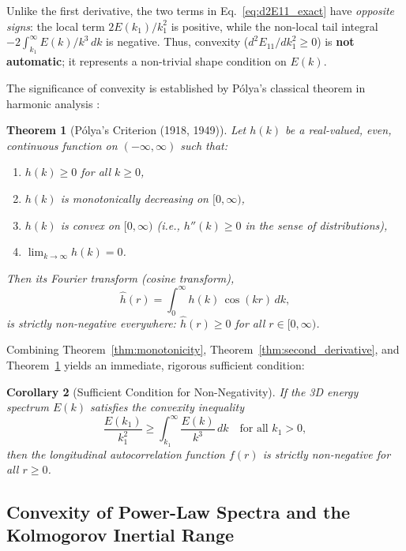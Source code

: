 \documentclass[lineno]{jfm}
\newtheorem{theorem}{Theorem}
\newtheorem{corollary}[theorem]{Corollary}
\begin{document}
Unlike the first derivative, the two terms in Eq.~\eqref{eq:d2E11_exact} have \emph{opposite signs}: the local term $2E(k_1)/k_1^2$ is positive, while the non-local tail integral $-2\int_{k_1}^\infty E(k)/k^3\,dk$ is negative. Thus, convexity ($d^2 E_{11}/dk_1^2 \ge 0$) is \textbf{not automatic}; it represents a non-trivial shape condition on $E(k)$.

The significance of convexity is established by P\'olya's classical theorem in harmonic analysis \citep{Polya1949}:

\begin{theorem}[P\'olya's Criterion (1918, 1949)]
\label{thm:polya}
Let $h(k)$ be a real-valued, even, continuous function on $(-\infty, \infty)$ such that:
\begin{enumerate}
\item $h(k) \ge 0$ for all $k \ge 0$,
\item $h(k)$ is monotonically decreasing on $[0, \infty)$,
\item $h(k)$ is convex on $[0, \infty)$ (i.e., $h''(k) \ge 0$ in the sense of distributions),
\item $\lim_{k \to \infty} h(k) = 0$.
\end{enumerate}
Then its Fourier transform (cosine transform),
\begin{equation}
\hat{h}(r) = \int_0^\infty h(k)\,\cos(kr)\,dk,
\end{equation}
is strictly non-negative everywhere: $\hat{h}(r) \ge 0$ for all $r \in [0, \infty)$.
\end{theorem}

Combining Theorem~\ref{thm:monotonicity}, Theorem~\ref{thm:second_derivative}, and Theorem~\ref{thm:polya} yields an immediate, rigorous sufficient condition:

\begin{corollary}[Sufficient Condition for Non-Negativity]
\label{cor:sufficient}
If the 3D energy spectrum $E(k)$ satisfies the convexity inequality
\begin{equation}
\frac{E(k_1)}{k_1^2} \ge \int_{k_1}^\infty \frac{E(k)}{k^3}\,dk \quad \text{for all } k_1 > 0,
\label{eq:convexity_condition}
\end{equation}
then the longitudinal autocorrelation function $f(r)$ is strictly non-negative for all $r \ge 0$.
\end{corollary}

\subsection{Convexity of Power-Law Spectra and the Kolmogorov Inertial Range}
\end{document}

